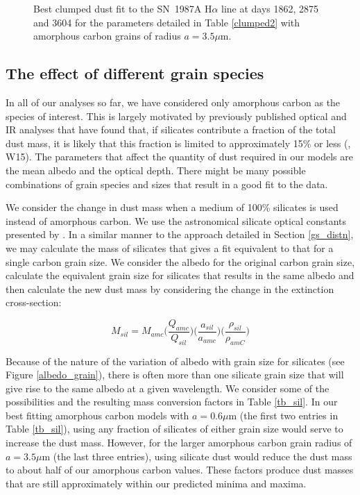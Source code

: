 \documentclass[useAMS,usenatbib,usegraphicx]{mnras}
\begin{document}
\begin{figure}
\caption{Best clumped dust fit to the SN~1987A  H$\alpha$ line at days 1862, 2875 and 
3604 for the parameters detailed in Table \ref{clumped2} with amorphous carbon grains of radius $a=3.5\mu$m.}
\label{d1862_3604_cmax}

\end{figure}

\subsection{The effect of different grain species}
\label{species}
In all of our analyses so far, we have considered only amorphous carbon as the species of interest.  This is largely motivated by previously published optical and IR analyses that have found that, if silicates contribute a fraction of the total dust mass, it is likely that this fraction is limited to approximately 15\% or less (\citet{Ercolano2007}, W15).  The parameters that affect the quantity of dust required in our models are the mean albedo and the optical depth.  There might be many possible combinations of grain species and sizes that result in a good fit to the data.  

We consider the change in dust mass when a medium of 100\% silicates is used instead of amorphous carbon.  We use the astronomical silicate optical constants presented by \cite{Draine1984}.  In a similar manner to the approach detailed in Section \ref{gs_distn}, we may calculate the mass of silicates that gives a fit equivalent to that for a single carbon grain size.  We consider the albedo for the original carbon grain size, calculate the equivalent grain size for silicates that results in the same albedo and then calculate the new dust mass by considering the change in the extinction cross-section:

\begin{equation}
M_{sil} = M_{amc} \Big( \frac{Q_{amc}}{Q_{sil}} \Big) \Big(\frac{a_{sil}}{a_{amc}}\Big) \Big(\frac{\rho_{sil}}{\rho_{amC}}\Big)
\end{equation}

Because of the nature of the variation of albedo with grain size for silicates (see Figure \ref{albedo_grain}), there is often more than one silicate grain size that will give rise to the same albedo at a given wavelength.  We consider some of the possibilities and the resulting mass conversion factors in Table \ref{tb_sil}.  In our best fitting amorphous carbon models with $a=0.6\mu$m (the first two entries in Table \ref{tb_sil}), using any fraction of silicates of either grain size would serve to increase the dust mass.  However, for the larger amorphous carbon grain radius of $a=3.5\mu$m (the last three entries), using silicate dust would reduce the dust mass to about half of our amorphous carbon values. These factors produce dust masses that are still approximately within our predicted minima and maxima.
\end{document}
